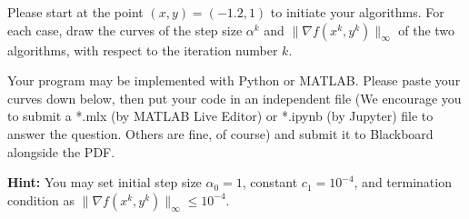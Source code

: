 \documentclass[10pt]{article}
\begin{document}
Please start at the point $(x,y) = ( -1.2, 1 )$ to initiate your algorithms. For each case, draw the curves of the step size $\alpha^k$ and $\| \nabla f(x^k,y^k) \|_{\infty}$ of the two algorithms, with respect to the iteration number $k$. 

Your program may be implemented with Python or MATLAB. Please paste your curves down below, then put your code in an independent file (We encourage you to submit a *.mlx (by MATLAB Live Editor) or *.ipynb (by Jupyter) file to answer the question. Others are fine, of course) and submit it to Blackboard alongside the PDF. 

\textbf{Hint:} You may set initial step size $\alpha_0 = 1$, constant $c_1 = 10^{-4}$, and termination condition as $\| \nabla f(x^k,y^k) \|_{\infty} \leq 10^{-4}$.
\end{document}
